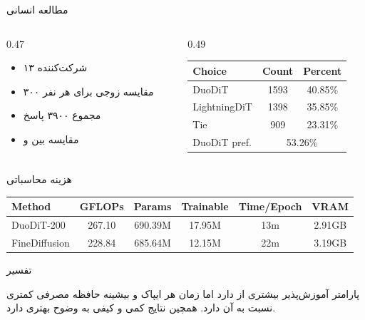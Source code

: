 \documentclass[aspectratio=169, 10pt]{beamer}
\newcommand{\duo}{\lr{DuoDiT}}
\newcommand{\compactitems}{\setlength{\itemsep}{0.35em}}
\newenvironment{duobox}[1]{%
    \begin{block}{#1}\setlength{\parskip}{0.2em}\small
}{%
    \end{block}
}
\begin{document}
\begin{frame}{مطالعه انسانی}
    \begin{columns}[onlytextwidth]
        \begin{column}{0.47\textwidth}
            \begin{itemize}
                \compactitems
                \item ۱۳ شرکت‌کننده
                \item ۳۰۰ مقایسه زوجی برای هر نفر
                \item مجموع ۳۹۰۰ پاسخ
                \item مقایسه بین \duo{} و 
            \end{itemize}
        \end{column}
        \begin{column}{0.49\textwidth}
            \begin{latin}
            \begin{tabular}{lcc}
                \toprule
                Choice & Count & Percent\\
                \midrule
                DuoDiT & 1593 & 40.85\%\\
                LightningDiT & 1398 & 35.85\%\\
                Tie & 909 & 23.31\%\\
                \midrule
                DuoDiT pref. & \multicolumn{2}{c}{53.26\%}\\
                \bottomrule
            \end{tabular}
            \end{latin}
        \end{column}
    \end{columns}
\end{frame}

\begin{frame}{هزینه محاسباتی}
    \centering
    \begin{latin}
    \begin{tabular}{lccccc}
        \toprule
        Method & GFLOPs & Params & Trainable & Time/Epoch & VRAM\\
        \midrule
        DuoDiT-200 & 267.10 & 690.39M & 17.95M & 13m & 2.91GB\\
        FineDiffusion & 228.84 & 685.64M & 12.15M & 22m & 3.19GB\\
        \bottomrule
    \end{tabular}
    \end{latin}
    \vspace{0.9em}
    \begin{duobox}{تفسیر}
        \duo{}
        پارامتر آموزش‌پذیر بیشتری از 
        دارد اما زمان هر ایپاک و بیشینه حافظه مصرفی کمتری نسبت به آن دارد.
        همچین نتایج کمی و کیفی به وضوح بهتری دارد.
    \end{duobox}
\end{frame}
\end{document}
